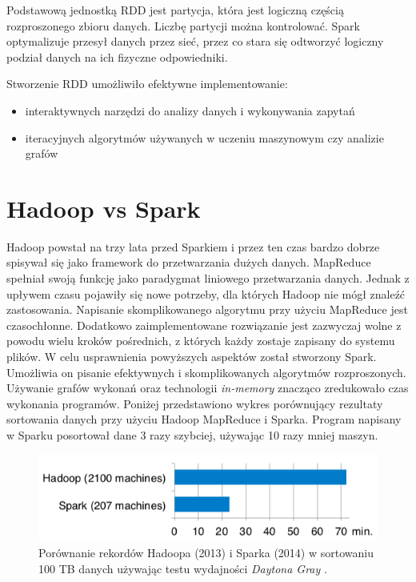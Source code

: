 \documentclass[licencjacka]{pracamgr}
\begin{document}
Podstawową jednostką RDD jest partycja, która jest logiczną częścią rozproszonego zbioru danych. Liczbę partycji można kontrolować. Spark optymalizuje przesył danych przez sieć, przez co stara się odtworzyć logiczny podział danych na ich fizyczne odpowiedniki.

Stworzenie RDD umożliwiło efektywne implementowanie:
\begin{itemize}
    \item interaktywnych narzędzi do analizy danych i wykonywania zapytań
    \item iteracyjnych algorytmów używanych w uczeniu maszynowym czy analizie grafów
\end{itemize}

\section{Hadoop vs Spark}

Hadoop powstał na trzy lata przed Sparkiem i przez ten czas bardzo dobrze spisywał się jako framework do przetwarzania dużych danych. MapReduce spełniał swoją funkcję jako paradygmat liniowego przetwarzania danych. Jednak z upływem czasu pojawiły się nowe potrzeby, dla których Hadoop nie mógł znaleźć zastosowania. Napisanie skomplikowanego algorytmu przy użyciu MapReduce jest czasochłonne. Dodatkowo zaimplementowane rozwiązanie jest zazwyczaj wolne z powodu wielu kroków pośrednich, z których każdy zostaje zapisany do systemu plików. W celu usprawnienia powyższych aspektów został stworzony Spark. Umożliwia on pisanie efektywnych i skomplikowanych algorytmów rozproszonych. Używanie grafów wykonań oraz technologii \textit{in-memory} znacząco zredukowało czas wykonania programów. Poniżej przedstawiono wykres porównujący rezultaty sortowania danych przy użyciu Hadoop MapReduce i Sparka. Program napisany w Sparku posortował dane 3 razy szybciej, używając 10 razy mniej maszyn.


\begin{figure}[H]
    \caption{Porównanie rekordów Hadoopa (2013) i Sparka (2014) w sortowaniu 100 TB danych używając testu wydajności \textit{Daytona Gray} \cite{Armbrust:2015:SSR:2824032.2824080}.}
    \includegraphics[width=15cm]{hadoop_vs_spark.png}
\end{figure}
\end{document}
